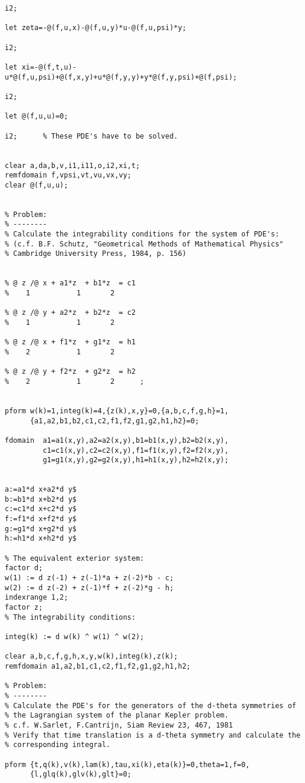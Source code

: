 {\begin{verbatim}
i2;

let zeta=-@(f,u,x)-@(f,u,y)*u-@(f,u,psi)*y;

i2;

let xi=-@(f,t,u)-u*@(f,u,psi)+@(f,x,y)+u*@(f,y,y)+y*@(f,y,psi)+@(f,psi);

i2;

let @(f,u,u)=0;

i2;      % These PDE's have to be solved.


clear a,da,b,v,i1,i11,o,i2,xi,t;
remfdomain f,vpsi,vt,vu,vx,vy;
clear @(f,u,u);


% Problem:
% --------
% Calculate the integrability conditions for the system of PDE's:
% (c.f. B.F. Schutz, "Geometrical Methods of Mathematical Physics"
% Cambridge University Press, 1984, p. 156)


% @ z /@ x + a1*z  + b1*z  = c1
%    1           1       2

% @ z /@ y + a2*z  + b2*z  = c2
%    1           1       2

% @ z /@ x + f1*z  + g1*z  = h1
%    2           1       2

% @ z /@ y + f2*z  + g2*z  = h2
%    2           1       2      ;


pform w(k)=1,integ(k)=4,{z(k),x,y}=0,{a,b,c,f,g,h}=1,
      {a1,a2,b1,b2,c1,c2,f1,f2,g1,g2,h1,h2}=0;

fdomain  a1=a1(x,y),a2=a2(x,y),b1=b1(x,y),b2=b2(x,y),
         c1=c1(x,y),c2=c2(x,y),f1=f1(x,y),f2=f2(x,y),
         g1=g1(x,y),g2=g2(x,y),h1=h1(x,y),h2=h2(x,y);


a:=a1*d x+a2*d y$
b:=b1*d x+b2*d y$
c:=c1*d x+c2*d y$
f:=f1*d x+f2*d y$
g:=g1*d x+g2*d y$
h:=h1*d x+h2*d y$

% The equivalent exterior system:
factor d;
w(1) := d z(-1) + z(-1)*a + z(-2)*b - c;
w(2) := d z(-2) + z(-1)*f + z(-2)*g - h;
indexrange 1,2;
factor z;
% The integrability conditions:

integ(k) := d w(k) ^ w(1) ^ w(2);

clear a,b,c,f,g,h,x,y,w(k),integ(k),z(k);
remfdomain a1,a2,b1,c1,c2,f1,f2,g1,g2,h1,h2;

% Problem:
% --------
% Calculate the PDE's for the generators of the d-theta symmetries of
% the Lagrangian system of the planar Kepler problem.
% c.f. W.Sarlet, F.Cantrijn, Siam Review 23, 467, 1981
% Verify that time translation is a d-theta symmetry and calculate the
% corresponding integral.

pform {t,q(k),v(k),lam(k),tau,xi(k),eta(k)}=0,theta=1,f=0,
      {l,glq(k),glv(k),glt}=0;


\end{verbatim}}
